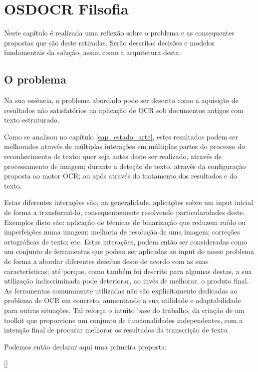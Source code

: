 \chapter{OSDOCR Filsofia}
\label{cap_osdocr_filosofia}

Neste capítulo é realizada uma reflexão sobre o problema e as consequentes propostas que são deste retiradas. Serão descritas decisões e modelos fundamentais da solução, assim como a arquitetura desta. 

\section{O problema}

Na sua essência, o problema abordado pode ser descrito como a aquisição de resultados não satisfatórios na aplicação de OCR sob documentos antigos com texto estruturado. 

Como se analisou no capítulo \ref{cap_estado_arte}, estes resultados podem ser melhorados através de múltiplas interações em múltiplas partes do processo do reconhecimento de texto: quer seja antes deste ser realizado, através de processamento de imagem; durante a deteção de texto, através da configuração proposta ao motor OCR; ou após através do tratamento dos resultados e do texto.

Estas diferentes interações são, na generalidade, aplicações sobre um input inicial de forma a transformá-lo, consequentemente resolvendo particularidades deste. Exemplos disto são: aplicação de técnicas de binarização que reduzem ruído ou imperfeições numa imagem; melhoria de resolução de uma imagem; correções ortográficas de texto; etc. Estas interações, podem então ser consideradas como um conjunto de ferramentas que podem ser aplicadas ao input do nosso problema de forma a abordar diferentes defeitos deste de acordo com as suas características; até porque, como também foi descrito para algumas destas, a sua utilização indiscriminada pode deteriorar, ao invés de melhorar, o produto final. As ferramentas comummente utilizadas não são explicitamente dedicadas ao problema de OCR em concreto, aumentando a sua utilidade e adaptabilidade para outras situações.
Tal reforça o intuito base do trabalho, da criação de um toolkit que proporcione um conjunto de funcionalidades independentes, com a intenção final de procurar melhorar os resultados da transcrição de texto.

Podemos então declarar aqui uma primeira proposta: 

[\normalsize]

